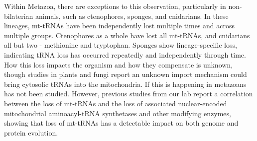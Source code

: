 \documentclass[../main.tex]{subfiles}
\begin{document}
Within Metazoa, there are exceptions to this observation, particularly in non-bilaterian animals, such as ctenophores, sponges, and cnidarians. In these lineages, mt-tRNAs have been independently lost multiple times and across multiple groups. Ctenophores as a whole have lost all mt-tRNAs, and cnidarians all but two - methionine and tryptophan. Sponges show lineage-specific loss, indicating tRNA loss has occurred repeatedly and independently through time. How this loss impacts the organism and how they compensate is unknown, though studies in plants and fungi report an unknown import mechanism could bring cytosolic tRNAs into the mitochondria. If this is happening in metazoans has not been studied. However, previous studies from our lab report a correlation between the loss of mt-tRNAs and the loss of associated nuclear-encoded mitochondrial aminoacyl-tRNA synthetases and other modifying enzymes, showing that loss of mt-tRNAs has a detectable impact on both genome and protein evolution. 
\end{document}
